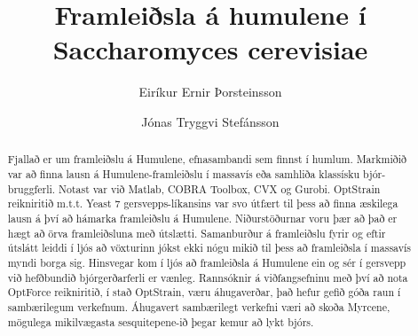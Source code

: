 \documentclass[11pt]{article}
\title{Framleiðsla á humulene í Saccharomyces cerevisiae}
\author{Eiríkur Ernir Þorsteinsson \and Jónas Tryggvi Stefánsson}
\date{}
\begin{document}
\maketitle

\setlength{\columnsep}{1cm}

\begin{abstract}
Fjallað er um framleiðslu á Humulene, efnasambandi sem finnst í humlum. Markmiðið var að finna lausn á Humulene-framleiðslu í massavís eða samhliða klassísku bjór-bruggferli. Notast var við Matlab, COBRA Toolbox, CVX og Gurobi.  OptStrain reikniritið m.t.t. Yeast 7 gersvepps-líkansins var svo útfært  til þess að finna æskilega lausn á því að hámarka framleiðslu á Humulene. Niðurstöðurnar voru þær að það er hægt að örva framleiðsluna með útslætti. Samanburður á framleiðslu fyrir og eftir útslátt leiddi í ljós að vöxturinn jókst ekki nógu mikið til þess að framleiðsla í massavís myndi borga sig. Hinsvegar kom í ljós að framleiðsla á Humulene ein og sér í gersvepp við hefðbundið bjórgerðarferli er vænleg. Rannsóknir á viðfangsefninu með því að nota OptForce reikniritið, í stað OptStrain, væru áhugaverðar, það hefur gefið góða raun í sambærilegum verkefnum. Áhugavert sambærilegt verkefni væri að skoða Myrcene, mögulega mikilvægasta sesquitepene-ið þegar kemur að lykt bjórs.
\end{abstract}
\end{document}
